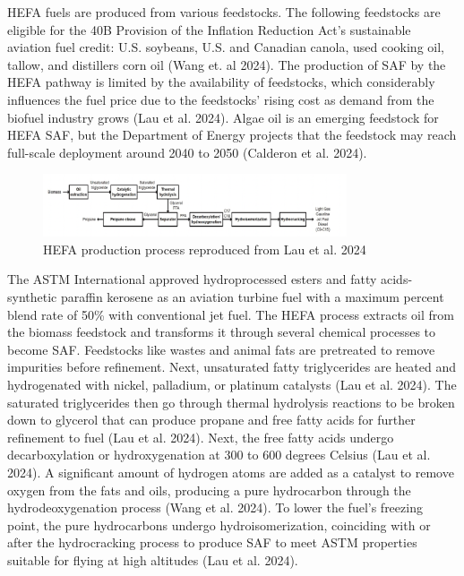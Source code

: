 \documentclass[12pt]{article}
\begin{document}
HEFA fuels are produced from various feedstocks. The following feedstocks are eligible for the 40B Provision of the Inflation Reduction Act’s sustainable aviation fuel credit: U.S. soybeans, U.S. and Canadian canola, used cooking oil, tallow, and distillers corn oil (Wang et. al 2024). The production of SAF by the HEFA pathway is limited by the availability of feedstocks, which considerably influences the fuel price due to the feedstocks' rising cost as demand from the biofuel industry grows (Lau et al. 2024). Algae oil is an emerging feedstock for HEFA SAF, but the Department of Energy projects that the feedstock may reach full-scale deployment around 2040 to 2050 (Calderon et al. 2024). 


\begin{figure}[H]
\centering
\includegraphics[width=0.8\textwidth]{Fig 4.png} %
\caption{HEFA production process reproduced from Lau et al. 2024}
\label{figure 4}
\end{figure}

The ASTM International approved hydroprocessed esters and fatty acids-synthetic paraffin kerosene as an aviation turbine fuel with a maximum percent blend rate of 50\% with conventional jet fuel. The HEFA process extracts oil from the biomass feedstock and transforms it through several chemical processes to become SAF. Feedstocks like wastes and animal fats are pretreated to remove impurities before refinement. Next, unsaturated fatty triglycerides are heated and hydrogenated with nickel, palladium, or platinum catalysts (Lau et al. 2024). The saturated triglycerides then go through thermal hydrolysis reactions to be broken down to glycerol that can produce propane and free fatty acids for further refinement to fuel (Lau et al. 2024). Next, the free fatty acids undergo decarboxylation or hydroxygenation at 300 to 600 degrees Celsius (Lau et al. 2024). A significant amount of hydrogen atoms are added as a catalyst to remove oxygen from the fats and oils, producing a pure hydrocarbon through the hydrodeoxygenation process (Wang et al. 2024). To lower the fuel’s freezing point, the pure hydrocarbons undergo hydroisomerization, coinciding with or after the hydrocracking process to produce SAF to meet ASTM properties suitable for flying at high altitudes (Lau et al. 2024). 
\end{document}
